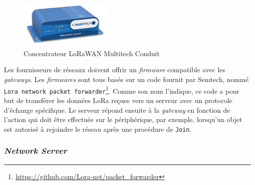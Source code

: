 \begin{figure}[ht!]
    \centering
    \includegraphics[width=0.4\textwidth]{Figures/Protocols/LoRaWAN/multitech_conduit.jpg}
    \caption{Concentrateur LoRaWAN Multitech Conduit}
    \label{fig-multitech_conduit}
\end{figure}

Les fournisseurs de réseaux doivent offrir un \textit{firmware} compatible avec les \textit{gateways}. Les \textit{firmwares} sont tous basés sur un code fournit par Semtech, nommé \texttt{Lora network packet forwarder}\footnote{\url{https://github.com/Lora-net/packet_forwarder}}. Comme son nom l'indique, ce code a pour but de transférer les données LoRa reçues vers un serveur avec un protocole d'échange spécifique. Le serveur répond ensuite à la \textit{gateway} en fonction de l'action qui doit être effectuée sur le périphérique, par exemple, lorsqu'un objet est autorisé à rejoindre le réseau après une procédure de \texttt{Join}.

\subsubsection{\textit{Network Server}}

